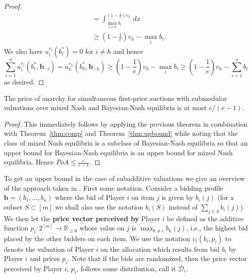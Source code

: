 \begin{proof}
\begin{align*}
                               &= \int_{\max_{i \neq h} b_i}^{\left( 1 - \frac{1}{e} \right)v_h} \, dx \\
                               &\geq \left( 1 - \frac{1}{e} \right)v_h - \max_i b_i
  .\end{align*}
  We also have $ u_i^{v_i}(b_i^{*}) = 0 $ for $ i \neq h $ and hence
  \begin{equation}
    \sum_{i = 1}^{n} u_i^{v_i}(b_i^{*}, \mathbf{b}_{-i}) = u_h^{v_h}(b_h^{*}, \mathbf{b}_{-h}) \geq \left( 1 - \frac{1}{e} \right)v_h - \max_{i }b_i \geq \left( 1 - \frac{1}{e} \right)v_h - \sum_{i = 1}^{n} b_i
  \end{equation}
  as desired.
\end{proof}

\begin{corollary}
  The price of anarchy for simultaneous first-price auctions with submodular valuations over mixed Nash and Bayesian-Nash equilibria is at most $ e /(e - 1) $.
\end{corollary}
\begin{proof}
  This immediately follows by applying the previous theorem in combination with Theorem~\ref{thm:comp} and Theorem~\ref{thm:upbound} while noting that the class of mixed Nash equilibria is a subclass of Bayesian-Nash equilibria so that an upper bound for Bayesian-Nash equilibria is an upper bound for mixed Nash equilibria. Hence $ PoA \leq \frac{e}{e - 1} $.
\end{proof}

To get an upper bound in the case of subadditive valuations we give an overview of the approach taken in \cite{10.1145/2488608.2488634}. First some notation. Consider a bidding profile $ \mathbf{b} = (b_1, \ldots, b_n) $ where the bid of Player $ i $ on item $ j $ is given by $ b_i(j) $ (for a subset $ S \subset [m] $ we shall also use the notation $ b_i(S) $ instead of $ \sum_{j \in S} b_i(j) $). We then let the \textbf{price vector perceived by} Player $ i $ be defined as the additive function $ p_i: 2^{[m]} \to \mathbb{R}_{\geq 0} $ whose value on $ j $ is $ \max_{k\neq i}b_k(j) $, i.e., the highest bid placed by the other bidders on each item. We use the notation $ v_i(b_i, p_i) $ to denote the valuation of Player $ i $ on the allocation which results from bid $ b_i $ by Player $ i $ and prices $ p_i $. Note that if the bids are randomized, then the price vector perceived by Player $ i $, $ p_i $, follows some distribution, call it $ \mathcal{D}_i $.

